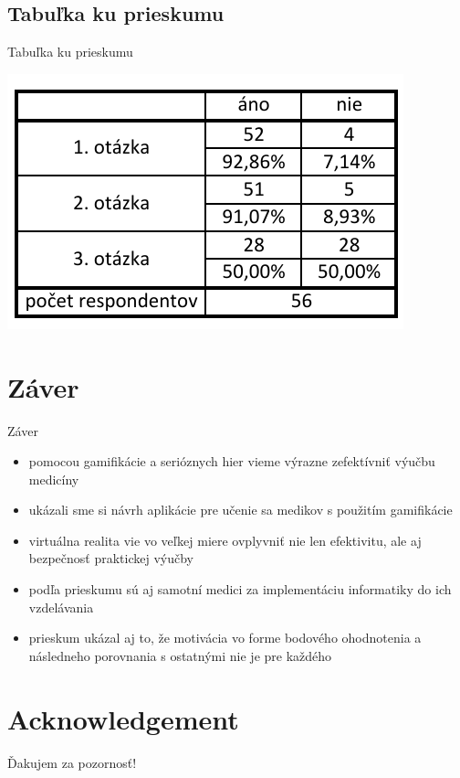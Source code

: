 \documentclass[10pt]{beamer}
\begin{document}
\subsection{Tabuľka ku prieskumu}\label{prieskum:tabulka}
    \begin{frame}{Tabuľka ku prieskumu}
\begin{table}[hbtp]
\centering
\includegraphics[scale=0.9]{tabulkakprojektu.pdf}
\caption{Tabuľka ku vykonanému prieskumu.}
\end{table}
    
    \end{frame}


\section{Záver}
    \begin{frame}{Záver}
    \begin{itemize}
  \setlength\itemsep{2em}
\item pomocou gamifikácie a serióznych hier vieme výrazne zefektívniť výučbu medicíny

\item ukázali sme si návrh aplikácie pre učenie sa medikov s použitím gamifikácie

\item virtuálna realita vie vo veľkej miere ovplyvniť nie len efektivitu, ale aj bezpečnosť praktickej výučby

	
\item podľa prieskumu sú aj samotní medici za implementáciu informatiky do ich vzdelávania
	
\item prieskum ukázal aj to, že motivácia vo forme bodového ohodnotenia a následneho porovnania s ostatnými nie je pre každého


\end{itemize}
    \end{frame}
    


\section*{Acknowledgement}  
\begin{frame}
\textcolor{myNewColorA}{\Huge{\centerline{Ďakujem za pozornosť!}}}
\end{frame}
\end{document}
